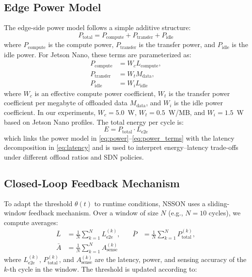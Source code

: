 \documentclass[journal]{IEEEtran}
\newcommand{\revblue}[1]{\textcolor{revblue}{#1}}
\begin{document}
\subsection{Edge Power Model}
\label{sec:power_model}

The edge-side power model follows a simple additive structure:
\begin{equation}
P_{\text{total}} = P_{\text{compute}} + P_{\text{transfer}} + P_{\text{idle}}
\label{eq:power}
\end{equation}
where $P_{\text{compute}}$ is the compute power, $P_{\text{transfer}}$ is the transfer power, and $P_{\text{idle}}$ is the idle power. For Jetson Nano, these terms are parameterized as:
\begin{equation}
\begin{aligned}
P_{\text{compute}} &= W_c L_{\text{compute}}, \\
P_{\text{transfer}} &= W_t M_{\text{data}}, \\
P_{\text{idle}} &= W_i L_{\text{idle}}
\end{aligned}
\label{eq:power_terms}
\end{equation}
where $W_c$ is an effective compute power coefficient, $W_t$ is the transfer power coefficient per megabyte of offloaded data $M_{\text{data}}$, and $W_i$ is the idle power coefficient. In our experiments, $W_c = 5.0$~W, $W_t = 0.5$~W/MB, and $W_i = 1.5$~W based on Jetson Nano profiles. The total energy per cycle is:
\begin{equation}
E = P_{\text{total}} \cdot L_{\text{e2e}}
\label{eq:energy}
\end{equation}
which links the power model in \eqref{eq:power}–\eqref{eq:power_terms} with the latency decomposition in \eqref{eq:latency} and is used to interpret energy–latency trade-offs under different offload ratios and SDN policies.

\subsection{Closed-Loop Feedback Mechanism}
\label{sec:feedback}

To adapt the threshold $\theta(t)$ to runtime conditions, NSSON uses a sliding-window feedback mechanism. Over a window of size $N$ (e.g., $N=10$ cycles), we compute averages:
\begin{equation}
\begin{alignedat}{2}
\bar{L} &= \frac{1}{N}\sum_{k=1}^{N}L_{\text{e2e}}^{(k)}, &\quad \bar{P} &= \frac{1}{N}\sum_{k=1}^{N}P_{\text{total}}^{(k)}, \\
\bar{A} &= \frac{1}{N}\sum_{k=1}^{N}A_{\text{sense}}^{(k)} & &
\end{alignedat}
\label{eq:averages}
\end{equation}
\revblue{where $L_{\text{e2e}}^{(k)}$, $P_{\text{total}}^{(k)}$, and
$A_{\text{sense}}^{(k)}$ are the latency, power, and sensing accuracy of
the $k$-th cycle in the window. The threshold is updated according to:}
\end{document}

